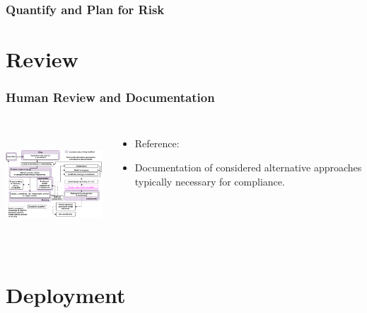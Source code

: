 \documentclass[11pt,
               aspectratio=169,
               hyperref={colorlinks}
               ]{beamer}
\begin{document}
		\begin{frame}
		
			\frametitle{Quantify and Plan for Risk}	
			
		\end{frame}

	\section{Review}

		\begin{frame}
		
			\frametitle{Human Review and Documentation}		
			
			\begin{columns}
	
				\centering
				\includegraphics[height=120pt]{img/hr.png}
				
				\vspace{-5pt}
				\begin{itemize}
					\item Reference: 
					\item Documentation of considered alternative approaches typically necessary for compliance.
				\end{itemize}
				
			\end{columns}
		
		\end{frame}

	\section{Deployment}
\end{document}
